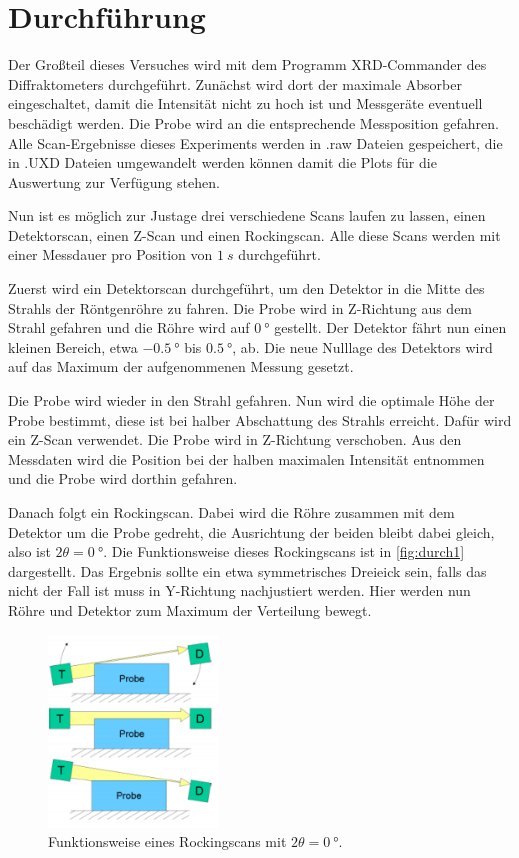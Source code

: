 \section{Durchführung}
\label{sec:Durchführung}

Der Großteil dieses Versuches wird mit dem Programm XRD-Commander des Diffraktometers durchgeführt.
Zunächst wird dort der maximale Absorber eingeschaltet, damit die Intensität nicht zu hoch ist und Messgeräte eventuell beschädigt werden.
Die Probe wird an die entsprechende Messposition gefahren.
Alle Scan-Ergebnisse dieses Experiments werden in .raw Dateien gespeichert, die in .UXD Dateien umgewandelt werden können damit die Plots für die Auswertung zur Verfügung stehen.

Nun ist es möglich zur Justage drei verschiedene Scans laufen zu lassen, einen Detektorscan, einen Z-Scan und einen Rockingscan.
Alle diese Scans werden mit einer Messdauer pro Position von $\SI{1}{s}$ durchgeführt.

Zuerst wird ein Detektorscan durchgeführt, um den Detektor in die Mitte des Strahls der Röntgenröhre zu fahren.
Die Probe wird in Z-Richtung aus dem Strahl gefahren und die Röhre wird auf $\SI{0}{\degree}$ gestellt.
Der Detektor fährt nun einen kleinen Bereich, etwa $\SI{-0.5}{\degree}$ bis $\SI{0.5}{\degree}$, ab.
Die neue Nulllage des Detektors wird auf das Maximum der aufgenommenen Messung gesetzt.

Die Probe wird wieder in den Strahl gefahren. 
Nun wird die optimale Höhe der Probe bestimmt, diese ist bei halber Abschattung des Strahls erreicht.
Dafür wird ein Z-Scan verwendet. 
Die Probe wird in Z-Richtung verschoben.
Aus den Messdaten wird die Position bei der halben maximalen Intensität entnommen und die Probe wird dorthin gefahren.

Danach folgt ein Rockingscan. 
Dabei wird die Röhre zusammen mit dem Detektor um die Probe gedreht, die Ausrichtung der beiden bleibt dabei gleich, also ist $2\theta = \SI{0}{\degree}$.
Die Funktionsweise dieses Rockingscans ist in \autoref{fig:durch1} dargestellt.
Das Ergebnis sollte ein etwa symmetrisches Dreieick sein, falls das nicht der Fall ist muss in Y-Richtung nachjustiert werden.
Hier werden nun Röhre und Detektor zum Maximum der Verteilung bewegt.

\begin{figure}
    \centering
    \includegraphics[width=0.4\textwidth]{images/rocking.png}
    \caption{Funktionsweise eines Rockingscans mit $2\theta = \SI{0}{\degree}$. \cite{V44}}
    \label{fig:durch1}
\end{figure}

